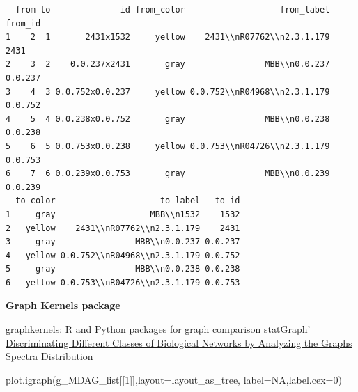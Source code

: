 \documentclass[
  letterpaper,
  DIV=11,
  numbers=noendperiod]{scrreprt}
\newenvironment{Shaded}{\begin{snugshade}}{\end{snugshade}}
\newcommand{\AttributeTok}[1]{\textcolor[rgb]{0.40,0.45,0.13}{#1}}
\newcommand{\ConstantTok}[1]{\textcolor[rgb]{0.56,0.35,0.01}{#1}}
\newcommand{\DecValTok}[1]{\textcolor[rgb]{0.68,0.00,0.00}{#1}}
\newcommand{\FunctionTok}[1]{\textcolor[rgb]{0.28,0.35,0.67}{#1}}
\newcommand{\NormalTok}[1]{\textcolor[rgb]{0.00,0.23,0.31}{#1}}
\begin{document}
\begin{verbatim}
  from to              id from_color                   from_label from_id
1    2  1       2431x1532     yellow    2431\\nR07762\\n2.3.1.179    2431
2    3  2    0.0.237x2431       gray                MBB\\n0.0.237 0.0.237
3    4  3 0.0.752x0.0.237     yellow 0.0.752\\nR04968\\n2.3.1.179 0.0.752
4    5  4 0.0.238x0.0.752       gray                MBB\\n0.0.238 0.0.238
5    6  5 0.0.753x0.0.238     yellow 0.0.753\\nR04726\\n2.3.1.179 0.0.753
6    7  6 0.0.239x0.0.753       gray                MBB\\n0.0.239 0.0.239
  to_color                     to_label   to_id
1     gray                   MBB\\n1532    1532
2   yellow    2431\\nR07762\\n2.3.1.179    2431
3     gray                MBB\\n0.0.237 0.0.237
4   yellow 0.0.752\\nR04968\\n2.3.1.179 0.0.752
5     gray                MBB\\n0.0.238 0.0.238
6   yellow 0.0.753\\nR04726\\n2.3.1.179 0.0.753
\end{verbatim}

\textbf{Graph Kernels package}

\href{https://academic.oup.com/bioinformatics/article/34/3/530/4209994?login=true}{graphkernels:
R and Python packages for graph comparison} statGraph'
\href{https://journals.plos.org/plosone/article?id=10.1371/journal.pone.0049949}{Discriminating
Different Classes of Biological Networks by Analyzing the Graphs Spectra
Distribution}

\begin{Shaded}
\begin{Highlighting}[]
\FunctionTok{plot.igraph}\NormalTok{(g\_MDAG\_list[[}\DecValTok{1}\NormalTok{]],}\AttributeTok{layout=}\NormalTok{layout\_as\_tree,}
            \AttributeTok{label=}\ConstantTok{NA}\NormalTok{,}\AttributeTok{label.cex=}\DecValTok{0}\NormalTok{)}
\end{Highlighting}
\end{Shaded}
\end{document}
